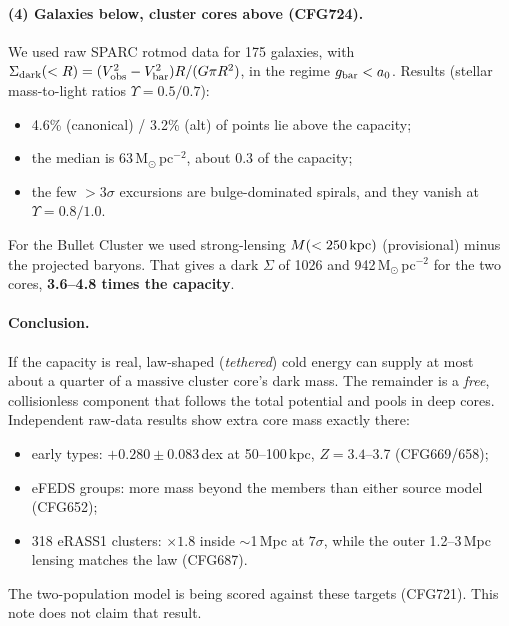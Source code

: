 \documentclass[10pt]{article}
\begin{document}
\paragraph{(4) Galaxies below, cluster cores above (CFG724).} We used raw SPARC rotmod data for 175 galaxies, with $\Sigma_{\rm dark}(<R)=(V_{\rm obs}^2-V_{\rm bar}^2)R/(G\pi R^2)$, in the regime $g_{\rm bar}<a_0$. Results (stellar mass-to-light ratios $\Upsilon=0.5/0.7$):
\begin{itemize}
\item 4.6\% (canonical) / 3.2\% (alt) of points lie above the capacity;
\item the median is 63\,M$_\odot$\,pc$^{-2}$, about 0.3 of the capacity;
\item the few $>3\sigma$ excursions are bulge-dominated spirals, and they vanish at $\Upsilon=0.8/1.0$.
\end{itemize}
For the Bullet Cluster we used strong-lensing $M(<250\,{\rm kpc})$ (provisional) minus the projected baryons. That gives a dark $\Sigma$ of 1026 and 942\,M$_\odot$\,pc$^{-2}$ for the two cores, \textbf{3.6--4.8 times the capacity}.

\paragraph{Conclusion.} If the capacity is real, law-shaped (\emph{tethered}) cold energy can supply at most about a quarter of a massive cluster core's dark mass. The remainder is a \emph{free}, collisionless component that follows the total potential and pools in deep cores. Independent raw-data results show extra core mass exactly there:
\begin{itemize}
\item early types: $+0.280\pm0.083$\,dex at 50--100\,kpc, $Z=3.4$--3.7 (CFG669/658);
\item eFEDS groups: more mass beyond the members than either source model (CFG652);
\item 318 eRASS1 clusters: $\times1.8$ inside $\sim$1\,Mpc at $7\sigma$, while the outer 1.2--3\,Mpc lensing matches the law (CFG687).
\end{itemize}
The two-population model is being scored against these targets (CFG721). This note does not claim that result.
\end{document}
